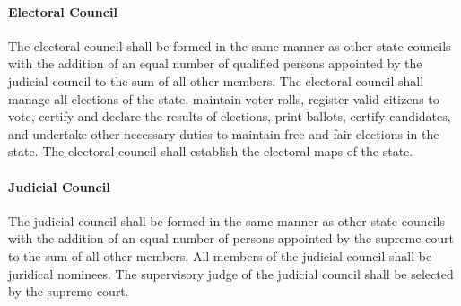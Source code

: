 \documentclass{article}
\begin{document}
\paragraph{Electoral Council}
The electoral council shall be formed in the same manner as other state councils with the addition of an equal number of qualified persons appointed by the judicial council to the sum of all other members. The electoral council shall manage all elections of the state, maintain voter rolls, register valid citizens to vote, certify and declare the results of elections, print ballots, certify candidates, and undertake other necessary duties to maintain free and fair elections in the state. The electoral council shall establish the electoral maps of the state.
\paragraph{Judicial Council}
The judicial council shall be formed in the same manner as other state councils with the addition of an equal number of persons appointed by the supreme court to the sum of all other members. All members of the judicial council shall be juridical nominees. The supervisory judge of the judicial council shall be selected by the supreme court.
\end{document}
